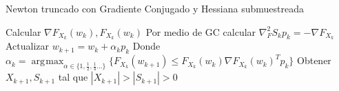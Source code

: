 \documentclass{book}
\theoremstyle{plain}
\theoremstyle{definition}
\theoremstyle{remark}
\DeclareMathOperator*{\argmax}{\arg\!\max}
\begin{document}
 \begin{algorithm}[H]
   \caption{Newton truncado con Gradiente Conjugado y Hessiana submuestreada}
    \begin{algorithmic}[2]
        \State Calcular $\nabla F_{X_k}(w_k), F_{X_k}(w_k)$
        \State Por medio de GC calcular $\nabla^2_F{S_k}p_k=-\nabla F_{X_k}$
        \EndWhile
        \State Actualizar $w_{k+1}=w_k + \alpha_kp_k$
        \State Donde  $\alpha_k = \displaystyle\argmax_{\alpha\in\{1,\frac{1}{2},\frac{1}{4}\dots\}}\{F_{X_k}(w_{k+1})\leq F_{X_k}(w_k)\nabla F_{X_k}(w_k)^Tp_k\}$
        \State Obtener $X_{k+1}, S_{k+1}$ tal que $|X_{k+1}|>|S_{k+1}|>0$
        \EndWhile
       \EndFunction
\end{algorithmic}
\end{algorithm}
\end{document}
